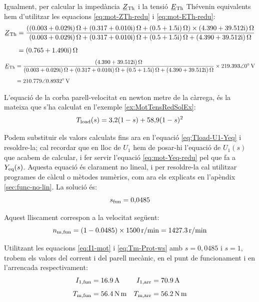 \begin{exemple}
	Igualment, per calcular  la impedància $\cmplx{Z}\ped{Th}$ i la tensió $\cmplx{E}\ped{Th}$ Thévenin equivalents hem d'utilitzar les equacions \eqref{eq:mot-ZTh-redu} i \eqref{eq:mot-ETh-redu}:
	\begin{align*}
		\cmplx{Z}\ped{Th} &= \frac{(\complexqty{0,003+j0,029}{\ohm} + \complexqty{0,317+j0,010}{\ohm} +  \complexqty{0,5+j1,5}{\ohm})\times\complexqty{4,390+j39,512}{\ohm}}
		{\complexqty{0,003+j0,029}{\ohm} + \complexqty{0,317+j0,010}{\ohm} + \complexqty{0,5+j1,5}{\ohm}+\complexqty{4,390+j39,512}{\ohm}}  \\[1ex]   
		&= \complexqty{0,765+j1,490}{\ohm}
	\end{align*}
	\vspace{-7mm}
	\begin{align*}		
		\cmplx{E}\ped{Th}  &= \frac{\complexqty{4,390+j39,512}{\ohm}}
		{\complexqty{0,003+j0,029}{\ohm} + \complexqty{0,317+j0,010}{\ohm} + \complexqty{0,5+j1,5}{\ohm}+\complexqty{4,390+j39,512}{\ohm}}\times
		\complexqty{219,393:0}{V}  \\[1ex]   
		&=  \complexqty{210,779:0,8932}{V}
	\end{align*}
	
	L'equació de la corba parell-velocitat en newton metre de la càrrega, és la mateixa que s'ha calculat en l'exemple  \ref{ex:MotTensRedSolEx}:
	\[
		T_\mathrm{load}(s) = 3{,}2 (1-s) + 58{,}9 (1-s)^2
	\]
	
	Podem  substituir els  valors calculats fins ara en l'equació \eqref{eq:Tload-U1-Yeq} i resoldre-la; cal recordar que en lloc de $U_1$ hem de posar-hi l'equació de $U_1(s)$ que acabem de calcular, i fer servir l'equació \eqref{eq:mot-Yeq-redu} pel que fa a $Y_\mathrm{eq}(s)$. Aquesta equació és clarament no lineal, i per  resoldre-la cal utilitzar programes de càlcul o mètodes numèrics, com ara els explicats en l'apèndix \ref{sec:func-no-lin}. La solució és:
	\[
		s_\mathrm{fun} = 0{,}0485
	\]
	
	Aquest lliscament correspon a la velocitat següent:
	\[
		n_\mathrm{m,fun}= (1-\num{0,0485})\times \qty{1500}{r/min} = \qty{1427,3}{r/min}
	\]
	
	Utilitzant les equacions \eqref{eq:I1-mot} i \eqref{eq:Tm-Prot-ws} amb $s=0{,}0485$ i $s=1$, trobem els valors del corrent i del parell mecànic, en el punt de funcionament  i en l'arrencada respectivament:
	\begin{align*}
		I_\mathrm{1,fun} &= \qty{16,9}{A} &
		I_\mathrm{1,arr} &= \qty{70,9}{A} \\[1ex] 
		T_\mathrm{m,fun} &=  \qty{56,4}{N.m} & 
		T_\mathrm{m,arr} &=  \qty{56,2}{N.m}
	\end{align*}
	

\end{exemple}
